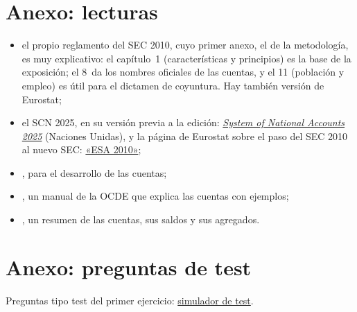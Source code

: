 \documentclass[11pt]{article}
\begin{document}
\section{Anexo: lecturas}\label{anexo:lecturas}

\begin{itemize}
\item el propio reglamento del SEC 2010\nocite{SEC2010}, cuyo primer anexo, el de la metodología, es muy explicativo: el capítulo~1 (características y principios) es la base de la exposición; el 8~da los nombres oficiales de las cuentas, y el 11 (población y empleo) es útil para el dictamen de coyuntura. Hay también versión de Eurostat\nocite{Eurostat2013SEC2010};
\item el SCN 2025, en su versión previa a la edición: \href{https://unstats.un.org/unsd/nationalaccount/docs/2025_SNA_Pre-edit.pdf}{\emph{System of National Accounts 2025}} (Naciones Unidas)\nocite{ONU2025SCN}, y la página de Eurostat sobre el paso del SEC 2010 al nuevo SEC: \href{https://ec.europa.eu/eurostat/web/esa-2010}{«ESA 2010»}\nocite{Eurostat2026ESA2030};
\item \textcite[caps.~6-8]{MunozCidadEtAl2020}, para el desarrollo de las cuentas;
\item \textcite{LequillerBlades2018}, un manual de la OCDE que explica las cuentas con ejemplos;
\item \textcite[cap.~2]{FMI2013Curso}, un resumen de las cuentas, sus saldos y sus agregados.
\end{itemize}

\section{Anexo: preguntas de test}\label{anexo:test}

\begin{anotaciones}
Preguntas tipo test del primer ejercicio: \href{https://www.victorgutierrezmarcos.es/oposicion/temario/primer-ejercicio/test/simulador.html?tema=3.A.30}{simulador de test}.
\end{anotaciones}

\bibliografia
\end{document}
